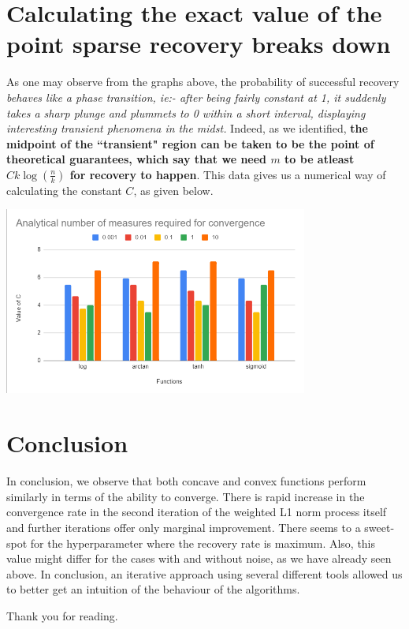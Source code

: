 \documentclass[a4paper,14pt]{article}
\numberwithin{definition}{section}
\numberwithin{mytheorem}{subsection}
\begin{document}










\section{Calculating the exact value of the point sparse recovery breaks down}
As one may observe from the graphs above, the probability of successful recovery \emph{behaves like a phase transition, ie:- after being fairly constant at 1, it suddenly takes a sharp plunge and plummets to 0 within a short interval, displaying interesting transient phenomena in the midst.} Indeed, as we identified, \textbf{the midpoint of the ``transient" region can be taken to be the point of theoretical guarantees, which say that we need $m$ to be atleast $Ck\log (\frac{n}{k})$ for recovery to happen}. This data gives us a numerical way of calculating the constant $C$, as given below.

\begin{center}
    \includegraphics[width=10cm]{constant.png}
\end{center}


\section{Conclusion}

In conclusion, we observe that both concave and convex functions perform similarly in terms of the ability to converge. There is rapid increase in the convergence rate in the second iteration of the weighted L1 norm process itself and further iterations offer only marginal improvement. There seems to a sweet-spot for the hyperparameter where the recovery rate is maximum. Also, this value might differ for the cases with and without noise, as we have already seen above. In conclusion, an iterative approach using several different tools allowed us to better get an intuition of the behaviour of the algorithms.


Thank you for reading.
\end{document}
